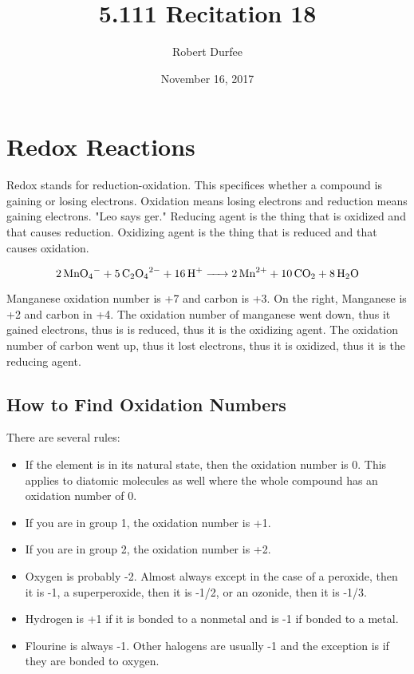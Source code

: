 \documentclass{article}
\title{ 5.111 Recitation 18 }
\author{ Robert Durfee }
\date{ November 16, 2017 }
\begin{document}
\maketitle

\section{ Redox Reactions }

Redox stands for reduction-oxidation. This specifices whether a compound is
gaining or losing electrons. Oxidation means losing electrons and reduction
means gaining electrons. "Leo says ger." Reducing agent is the thing that is
oxidized and that causes reduction. Oxidizing agent is the thing that is reduced
and that causes oxidation.

$$\ce{2MnO_4^- + 5 C_2O_4^{2-} + 16H+ -> 2Mn^{2+} + 10CO_2 + 8H_2O}$$

Manganese oxidation number is +7 and carbon is +3. On the right, Manganese is +2
and carbon in +4. The oxidation number of manganese went down, thus it gained
electrons, thus is is reduced, thus it is the oxidizing agent. The oxidation
number of carbon went up, thus it lost electrons, thus it is oxidized, thus it
is the reducing agent.

\subsection{ How to Find Oxidation Numbers}

There are several rules:

\begin{itemize}
    \item If the element is in its natural state, then the oxidation number is
        0. This applies to diatomic molecules as well where the whole
        compound has an oxidation number of 0.
    \item If you are in group 1, the oxidation number is +1.
    \item If you are in group 2, the oxidation number is +2.
    \item Oxygen is probably -2. Almost always except in the case of a
        peroxide, then it is -1, a superperoxide, then it is -1/2, or an
        ozonide, then it is -1/3.
    \item Hydrogen is +1 if it is bonded to a nonmetal and is -1 if bonded to a
        metal.
    \item Flourine is always -1. Other halogens are usually -1 and the exception
        is if they are bonded to oxygen.
\end{itemize}
\end{document}
